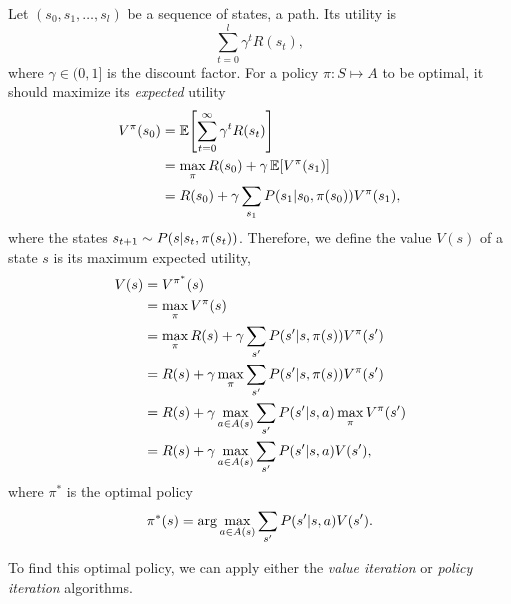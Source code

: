 \documentclass[11pt, a4paper]{article}
\begin{document}
\begin{enumerate}
    \begin{solution}    
        Let $(s_0, s_1, \dots, s_l)$ be a sequence of states, \ie{} a path. Its utility is
        \begin{equation*}
            \sum_{t = 0}^{l} \gamma^t R(s_t),
        \end{equation*}
        where $\gamma \in (0, 1]$ is the discount factor. For a policy $\pi : S \mapsto A$ to be optimal, it should maximize its \emph{expected} utility
        \begin{align*}
            V^\pi(s_0) & = \E \sbk*{\sum_{t = 0}^\infty \gamma^t R(s_t)} \\
            & = \max_\pi R(s_0) + \gamma \, \E \sbk*{V^\pi(s_1)} \\
            & = R(s_0) + \gamma \sum_{s_1} P(s_1 \knowing s_0, \pi(s_0)) V^\pi(s_1),
        \end{align*}
        where the states $s_{t+1} \sim P(s \vert s_t, \pi(s_t))$. Therefore, we define the value $V(s)$ of a state $s$ is its maximum expected utility, \ie{}
        \begin{align*}
            V(s) & = V^{\pi^*}(s) \\
            & = \max_\pi V^\pi(s) \\
            & = \max_\pi R(s) + \gamma \sum_{s'} P(s' \vert s, \pi(s)) V^\pi(s') \\
            & = R(s) + \gamma \max_\pi \sum_{s'} P(s' \vert s, \pi(s)) V^\pi(s') \\
            & = R(s) + \gamma \max_{a \in A(s)} \sum_{s'} P(s' \vert s, a) \max_\pi V^\pi(s') \\
            & = R(s) + \gamma \max_{a \in A(s)} \sum_{s'} P(s' \vert s, a) V(s') ,
        \end{align*}
        where $\pi^*$ is the optimal policy
        \begin{align*}
            \pi^*(s) = \arg \max_{a \in A(s)} \sum_{s'} P(s' \vert s, a) V(s') .
        \end{align*}
        
        To find this optimal policy, we can apply either the \emph{value iteration} or \emph{policy iteration} algorithms.
        

\end{solution}
\end{enumerate}
\end{document}
